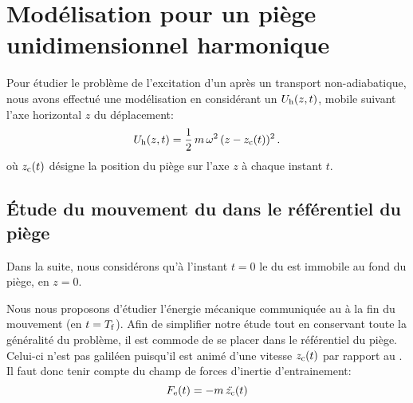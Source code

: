 \casse

\section{Modélisation pour un piège unidimensionnel harmonique}\label{sec:ModelisationTransport}

Pour étudier le problème de l'excitation d'un \n après un transport non-adiabatique, nous avons effectué une modélisation \ude en considérant un \pphar ${U_{\rm h}}(z,t)$, mobile suivant l'axe horizontal $z$ du déplacement:
\begin{equation}
	\Uh(z,t) = \frac{1}{2}\, m \,\PulsUh^2 \, (z-\zct)^2
	\pointformule
	\label{eq:Uh1D}
\end{equation}
où ${{z_{\rm c}}(t)}$ désigne la position du piège sur l'axe $z$ à chaque instant $t$. 

\subsection{Étude du mouvement du \cdm dans le référentiel du piège}

Dans la suite, nous considérons qu'à l'instant $t=0$ le \cdm du \nat est immobile au fond du piège, en $z=0$. 
%
%

Nous nous proposons d'étudier l'énergie mécanique communiquée au \nat
 à la fin du mouvement (\ie en $t={T_{\rm f}}$).
Afin de simplifier notre étude tout en conservant toute la généralité du problème, il est commode de se placer dans le référentiel du piège. Celui-ci n'est pas galiléen puisqu'il est animé d'une vitesse ${{z_{\rm c}}(t)}$ par rapport au . Il faut donc tenir compte du champ de forces d'inertie d'entrainement:
\begin{equation}
	\Fe(t) = -m\,\ddzct
	\label{eq:ForceInertie}
\end{equation}
%
%
%

